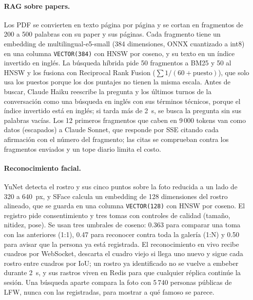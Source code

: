 \paragraph{RAG sobre papers.} Los PDF se convierten en texto página por página y se cortan
en fragmentos de 200 a 500 palabras con su paper y sus páginas. Cada fragmento tiene un
embedding de multilingual-e5-small (384 dimensiones, ONNX cuantizado a int8) en una
columna \texttt{VECTOR(384)} con HNSW por coseno, y su texto en un índice invertido en
inglés. La búsqueda híbrida pide 50 fragmentos a BM25 y 50 al HNSW y los fusiona con
Reciprocal Rank Fusion ($\sum 1/(60 + \text{puesto})$), que solo usa los puestos porque los
dos puntajes no tienen la misma escala. Antes de buscar, Claude Haiku reescribe la pregunta
y los últimos turnos de la conversación como una búsqueda en inglés con sus términos técnicos,
porque el índice invertido está en inglés; si tarda más de 2~s, se busca la pregunta sin sus
palabras vacías. Los 12 primeros
fragmentos que caben en 9\,000 tokens van como datos (escapados) a Claude Sonnet, que
responde por SSE citando cada afirmación con el número del fragmento; las citas se comprueban
contra los fragmentos enviados y un tope diario limita el costo.

\paragraph{Reconocimiento facial.} YuNet detecta el rostro y sus cinco puntos sobre la foto
reducida a un lado de 320 a 640~px, y SFace calcula un embedding de 128 dimensiones del rostro alineado, que
se guarda en una columna \texttt{VECTOR(128)} con HNSW por coseno. El registro pide
consentimiento y tres tomas con controles de calidad (tamaño, nitidez, pose). Se usan tres
umbrales de coseno: 0.363 para comparar una toma con las anteriores (1:1), 0.47 para
reconocer contra toda la galería (1:N) y 0.50 para avisar que la persona ya está
registrada. El reconocimiento en vivo recibe cuadros por WebSocket, descarta el cuadro
viejo si llega uno nuevo y sigue cada rostro entre cuadros por IoU; un rostro ya
identificado no se vuelve a embeber durante 2~s, y sus rastros viven en Redis para que
cualquier réplica continúe la sesión. Una búsqueda aparte compara la foto con 5\,740 personas
públicas de LFW, nunca con las registradas, para mostrar a qué famoso se parece.
